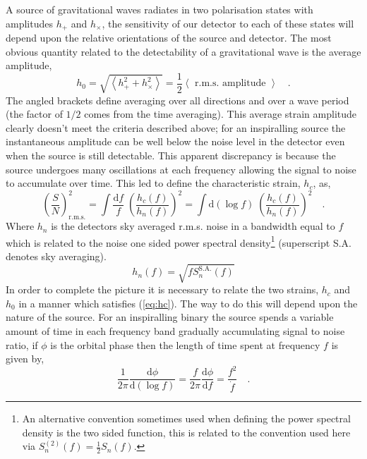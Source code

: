 A source of gravitational waves radiates in two polarisation states with amplitudes $h_{+}$ and $h_{\times}$, the sensitivity of our detector to each of these states will depend upon the relative orientations of the source and detector. The most obvious quantity related to the detectability of a gravitational wave  is the average amplitude,
\begin{equation}\label{eq:h0} h_{0}=\sqrt{\left< h_{+}^{2}+h_{\times}^{2} \right>}=\frac{1}{2}\left< \textrm{ r.m.s. amplitude } \right> \quad.\end{equation}
The angled brackets define averaging over all directions and over a wave period (the factor of $1/2$ comes from the time averaging). This average strain amplitude clearly doesn't meet the criteria described above; for an inspiralling source the instantaneous amplitude can be well below the noise level in the detector even when the source is still detectable. This apparent discrepancy is because the source undergoes many oscillations at each frequency allowing the signal to noise to accumulate over time. This led \cite{FinnThorne} to define the characteristic strain, $h_{c}$, as,
\begin{equation}\label{eq:hc} \left(\frac{S}{N}\right)_{\textrm{r.m.s.}}^{2}=\int \frac{\textrm{d}f}{f}\; \left(\frac{h_{c}(f)}{h_{n}(f)}\right)^{2}=\int \textrm{d}\left(\log f\right)\; \left(\frac{h_{c}(f)}{h_{n}(f)}\right)^{2} \quad.\end{equation}
Where $h_{n}$ is the detectors sky averaged r.m.s. noise in a bandwidth equal to $f$ which is related to the noise one sided power spectral density\footnote{An alternative convention sometimes used when defining the power spectral density is the two sided function, this is related to the convention used here via $S^{(2)}_{n}(f)=\frac{1}{2}S_{n}(f)$.} (superscript S.A. denotes sky averaging).
\begin{equation}\label{eq:powerspectraldensity} h_{n}(f)=\sqrt{fS_{n}^{\textrm{S.A.}}(f)} \end{equation}
In order to complete the picture it is necessary to relate the two strains, $h_{c}$ and $h_{0}$ in a manner which satisfies (\ref{eq:hc}). The way to do this will depend upon the nature of the source. For an inspiralling binary the source spends a variable amount of time in each frequency band gradually accumulating signal to noise ratio, if $\phi$ is the orbital phase then the length of time spent at frequency $f$ is given by,
\begin{equation}\label{eq:inspiral}
 \frac{1}{2\pi}\frac{\textrm{d}\phi}{\textrm{d}\left(\log f\right)} = \frac{f}{2\pi}\frac{\textrm{d}\phi}{\textrm{d}f}=\frac{f^{2}}{\dot{f}} \quad .
\end{equation}
